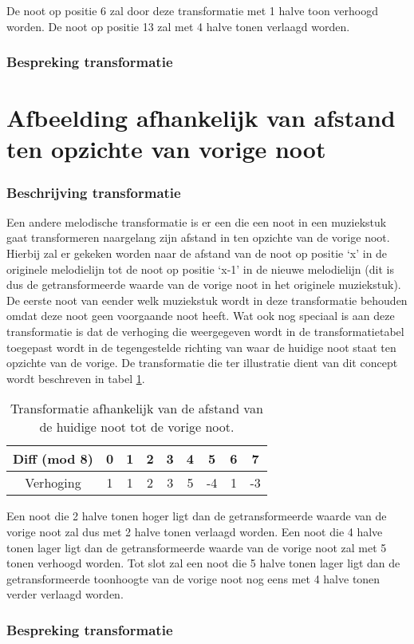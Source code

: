 De noot op positie 6 zal door deze transformatie met 1 halve toon verhoogd worden.  De noot op positie 13 zal met 4 halve tonen verlaagd worden.

\subsubsection{Bespreking transformatie}

\section{Afbeelding afhankelijk van afstand ten opzichte van vorige noot}
\label{MT:afstand_vorige}
\subsubsection{Beschrijving transformatie}
Een andere melodische transformatie is er een die een noot in een muziekstuk gaat transformeren naargelang zijn afstand in ten opzichte van de vorige noot. Hierbij zal er gekeken worden naar de afstand van de noot op positie `x' in de originele melodielijn tot de noot op positie `x-1' in de nieuwe melodielijn (dit is dus de getransformeerde waarde van de vorige noot in het originele muziekstuk). De eerste noot van eender welk muziekstuk wordt in deze transformatie behouden omdat deze noot geen voorgaande noot heeft. Wat ook nog speciaal is aan deze transformatie is dat de verhoging die weergegeven wordt in de transformatietabel toegepast wordt in de tegengestelde richting van waar de huidige noot staat ten opzichte van de vorige. De transformatie die ter illustratie dient van dit concept wordt beschreven in tabel \ref{tabel:transformatie2}.

\begin{table}
  \centering
  \begin{tabular}{c | c c c c c c c c }
    Diff (mod 8) & 0 & 1 & 2 & 3 & 4 & 5 & 6 & 7 \\
    \hline
    \hline
    Verhoging & 1 & 1 & 2 & 3 & 5 & -4 & 1 & -3 \\
  \end{tabular}
  \caption{Transformatie afhankelijk van de afstand van de huidige noot tot de vorige noot.}
  \label{tabel:transformatie2}
\end{table}

Een noot die 2 halve tonen hoger ligt dan de getransformeerde waarde van de vorige noot zal dus met 2 halve tonen verlaagd worden. Een noot die 4 halve tonen lager ligt dan de getransformeerde waarde van de vorige noot zal met 5 tonen verhoogd worden. Tot slot zal een noot die 5 halve tonen lager ligt dan de getransformeerde toonhoogte van de vorige noot nog eens met 4 halve tonen verder verlaagd worden.

\subsubsection{Bespreking transformatie}

